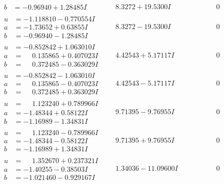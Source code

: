 \documentclass[1p]{elsarticle_modified}
\theoremstyle{definition}
\begin{document}
$$\begin{array}{c|c|c}
\begin{aligned}
b &= -0.96940 + 1.28485 I\end{aligned}
 & \phantom{-}8.3272 + 19.5300 I & \phantom{-0.000000 } 0 \\ \hline\begin{aligned}
u &= -1.118810 - 0.770554 I \\
a &= -1.73652 + 0.63855 I \\
b &= -0.96940 - 1.28485 I\end{aligned}
 & \phantom{-}8.3272 - 19.5300 I & \phantom{-0.000000 } 0 \\ \hline\begin{aligned}
u &= -0.852842 + 1.063010 I \\
a &= \phantom{-}0.135865 + 0.407023 I \\
b &= \phantom{-}0.372485 - 0.363029 I\end{aligned}
 & \phantom{-}4.42543 + 5.17117 I & \phantom{-0.000000 } 0 \\ \hline\begin{aligned}
u &= -0.852842 - 1.063010 I \\
a &= \phantom{-}0.135865 - 0.407023 I \\
b &= \phantom{-}0.372485 + 0.363029 I\end{aligned}
 & \phantom{-}4.42543 - 5.17117 I & \phantom{-0.000000 } 0 \\ \hline\begin{aligned}
u &= \phantom{-}1.123240 + 0.789966 I \\
a &= -1.48344 + 0.58122 I \\
b &= -1.16989 - 1.34831 I\end{aligned}
 & \phantom{-}9.71395 - 9.76955 I & \phantom{-0.000000 } 0 \\ \hline\begin{aligned}
u &= \phantom{-}1.123240 - 0.789966 I \\
a &= -1.48344 - 0.58122 I \\
b &= -1.16989 + 1.34831 I\end{aligned}
 & \phantom{-}9.71395 + 9.76955 I & \phantom{-0.000000 } 0 \\ \hline\begin{aligned}
u &= \phantom{-}1.352670 + 0.237321 I \\
a &= -1.40255 - 0.38503 I \\
b &= -1.021460 - 0.929167 I\end{aligned}
 & \phantom{-}1.34036 - 11.09600 I & \phantom{-0.000000 } 0 \\ \hline\begin{aligned}

\end{aligned}
\end{array}$$
\end{document}

